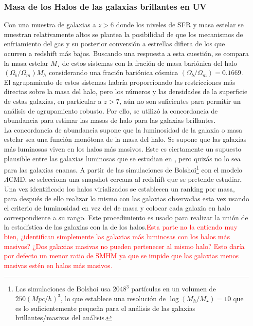 \subsubsection*{Masa de los Halos de las galaxias brillantes en UV}
Con una muestra de galaxias a $z>6$ donde los niveles de SFR y masa estelar se muestran relativamente altos se plantea la posibilidad de que los mecanismos de enfriamiento del gas y su posterior conversión a estrellas difiera de los que ocurren a redshift más bajos. Buscando una respuesta a esta cuestión, se compara la masa estelar $M_\star$ de estos sistemas con la fración de masa bariónica del halo $(\Omega_b/\Omega_m)M_h$ considerando una fración bariónica cósmica $(\Omega_b/\Omega_m)=0.1669$. El agrupamiento de estos sistemas habría proporcionado las restricciones más directas sobre la masa del halo, pero los números y las densidades de la superficie de estas galaxias, en particular a $z> 7$, aún no son suficientes para permitir un análisis de agrupamiento robusto. Por ello, se utilizó la concordancia de abundancia para estimar las masas de halo para las galaxias brillantes. \\

La concordancia de abundancia supone que la luminosidad de la galaxia o masa estelar sea una función monótona de la masa del halo. Se supone que las galaxias más luminosas viven en los halos más masivos. Este es ciertamente un supuesto plausible entre las galaxias luminosas que se estudian en \cite{finkelstein2015increasing}, pero quizás no lo sea para las galaxias enanas. A partir de las simulaciones de Bolshoi\footnote{Las simulaciones de Bolshoi usa $2048^3$ partículas en un volumen de $250 (Mpc/h)^3$, lo que establece una resolución de $\log(M_h/M_\star)=10$ que es lo suficientemente pequeña para el análisis de las galaxias brillantes/masivas del análisis.} con el modelo $\Lambda$CMD, se selecciona una snapshot cercana al redshift que se pretende estudiar. Una vez identificado los halos virializados se establecen un ranking por masa, para después de ello realizar lo mismo con las galaxias observadas esta vez usando el criterio de luminosidad en vez del de masa y colocar cada galaxia en halo correspondiente a su rango. Este procedimiento es usado para realizar la unión de la estadística de las galaxias con la de los halos.\textcolor{red}{Esta parte no la entiendo muy bien, ¿identifican simplemente las galaxias más luminosas con los halos más masivos? ¿Dos galaxias masivas no pueden pertenecer al mismo halo? Esto daría por defecto un menor ratio de SMHM ya que se impide que las galaxias menos masivas estén en halos más masivos.}\\

